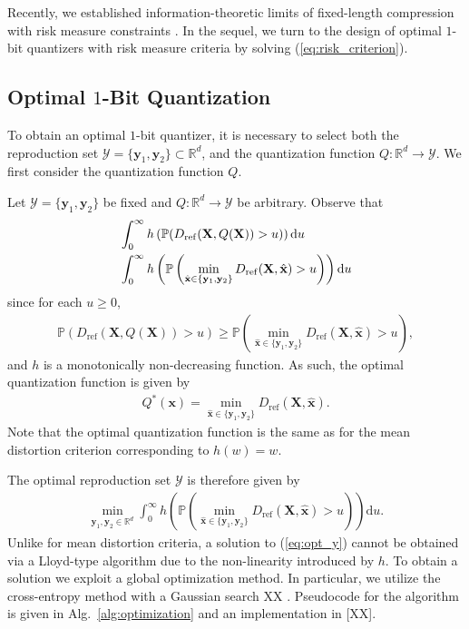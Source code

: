 \documentclass[conference]{IEEEtran}
\begin{document}
Recently, we established information-theoretic limits of fixed-length compression with risk measure constraints \cite{Egan2025risk}. In the sequel, we turn to the design of optimal $1$-bit quantizers with risk measure criteria by solving (\ref{eq:risk_criterion}). 

\subsection{Optimal $1$-Bit Quantization}

To obtain an optimal $1$-bit quantizer, it is necessary to select both the reproduction set $\mathcal{Y} = \{\mathbf{y}_1,\mathbf{y}_2\} \subset \mathbb{R}^d$, and the quantization function $Q: \mathbb{R}^d \rightarrow \mathcal{Y}$. We first consider the quantization function $Q$. 

Let $\mathcal{Y} = \{\mathbf{y}_1,\mathbf{y}_2\}$ be fixed and $Q: \mathbb{R}^d \rightarrow \mathcal{Y}$ be arbitrary. Observe that 
\begin{align}
	&\int_0^{\infty} h\left(\mathbb{P}(D_{\mathrm{ref}}(\mathbf{X},Q(\mathbf{X})) > u)\right)\mathrm{d}u\notag\\
	&\int_0^{\infty} h\left(\mathbb{P}\left(\min_{\hat{\mathbf{x}} \in \{\mathbf{y}_1,\mathbf{y}_2\}} D_{\mathrm{ref}}(\mathbf{X},\hat{\mathbf{x}}) > u\right)\right)\mathrm{d}u
\end{align}
since for each $u \geq 0$, 
\begin{align}
	\mathbb{P}(D_{\mathrm{ref}}(\mathbf{X},Q(\mathbf{X})) > u) \geq \mathbb{P}\left(\min_{\hat{\mathbf{x}} \in \{\mathbf{y}_1,\mathbf{y}_2\}} D_{\mathrm{ref}}(\mathbf{X},\hat{\mathbf{x}}) > u\right),
\end{align}
and $h$ is a monotonically non-decreasing function. As such, the optimal quantization function is given by 
\begin{align}
	Q^*(\mathbf{x}) = \min_{\hat{\mathbf{x}} \in \{\mathbf{y}_1,\mathbf{y}_2\}} D_{\mathrm{ref}}(\mathbf{X},\hat{\mathbf{x}}).
\end{align} 
Note that the optimal quantization function is the same as for the mean distortion criterion corresponding to $h(w) = w$. 

The optimal reproduction set $\mathcal{Y}$ is therefore given by 
\begin{align}\label{eq:opt_y}
	\min_{\mathbf{y}_1,\mathbf{y}_2 \in \mathbb{R}^d} \int_0^{\infty} h\left(\mathbb{P}\left(\min_{\hat{\mathbf{x}} \in \{\mathbf{y}_1,\mathbf{y}_2\}} D_{\mathrm{ref}}(\mathbf{X},\hat{\mathbf{x}}) > u\right)\right)\mathrm{d}u. 
\end{align}
Unlike for mean distortion criteria, a solution to (\ref{eq:opt_y}) cannot be obtained via a Lloyd-type algorithm \cite{Linde1980algorithm} due to the non-linearity introduced by $h$. To obtain a solution we exploit a global optimization method. In particular, we utilize the cross-entropy method with a Gaussian search XX \cite{Botev2013cross}. Pseudocode for the algorithm is given in Alg.~\ref{alg:optimization} and an implementation in [XX].
\end{document}
